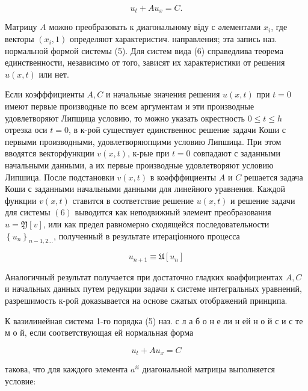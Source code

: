 \documentclass[10pt]{article}
\begin{document}
\[

u_{t}+A u_{x}=C .

\]



Матрицу $A$ можно преобразовать к диагональному віду с әлементами $x_{i}$, где векторы $\left(x_{i}, 1\right)$ определяют характеристич. направления; эта запись наз. нормальной формой системы (5). Для систем вида (6) справедлива теорема единственности, независимо от того, зависят их характеристики от решения $u(x, t)$ или нет.



Если коэфффициенты $A, C$ и начальные значения решения $u(x, t)$ при $t=0$ имеют первые производные по всем аргументам и эти производные удовлетворяют Липщица условию, то можно указать окрестность $0 \leqslant t \leqslant h$ отрезка оси $t=0$, в к-рой существует единственнос решение задачи Коши с первыми производными, удовлетворяюпцими условию Липшица. При этом вводятся векторфункции $v(x, t)$, к-рые при $t=0$ совпадают с заданными начальными данными, а их первые производные удовлетворяют условию Липшица. После подстановки $v(x, t)$ в коәфффициенты $A$ и $C$ решается задача Коши с заданными начальными данными для линейного уравнения. Каждой функции $v(x, t)$ ставится в соответствие решение $u(x, t)$ и решение задачи для системы $(6)$ выводится как неподвижный элемент преобразования $u=\mathfrak{Y}[v]$, или как предел равномерно сходящейся последовательности $\left\{u_{n}\right\}_{n-1,2 \ldots}$, полученный в результате итераціонного процесса



\[

u_{n+1} \equiv \mathfrak{U}\left[u_{n}\right]

\]



Аналогичный результат получается при достаточно гладких коаффициентах $A, C$ и начальных данных путем редукции задачи к системе интегральных уравнений, разрешимость к-рой доказывается на основе сжатых отображений принципа.



К вазилинейная система 1-го порядка (5) наз. с л а б о н е ли н ей н о й с и с те м о й, если соответствующая ей нормальная форма



\[

u_{t}+A u_{x}=C

\]



такова, что для каждого элемента $a^{i i}$ диагональной матрицы выполняется условие:
\end{document}
